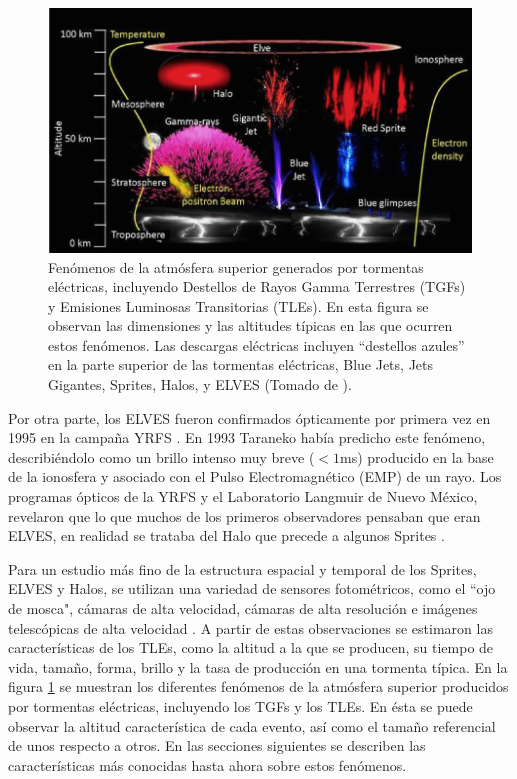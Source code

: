 \documentclass[12pt,oneside,openany,letter]{book}
\begin{document}
\begin{figure}
    \centering
    \includegraphics[scale=0.75]{figures/tle_and_tgf.png}
    \caption[Fenómenos de la atmósfera superior generados por tormentas eléctricas]{Fenómenos de la atmósfera superior generados por tormentas eléctricas, incluyendo Destellos de Rayos Gamma Terrestres (TGFs) y Emisiones Luminosas Transitorias (TLEs). En esta figura se observan las dimensiones y las altitudes típicas en las que ocurren estos fenómenos. Las descargas eléctricas incluyen ``destellos azules'' en la parte superior de las tormentas eléctricas, Blue Jets, Jets Gigantes, Sprites, Halos, y ELVES (Tomado de \cite{Gaskill2018}).}
    \label{fig:tle_and_tgf}
\end{figure}

Por otra parte, los ELVES fueron confirmados ópticamente por primera vez en 1995 en la campaña YRFS \cite{FukunishiEtal1996}. En 1993 Taraneko \cite{TaranenkoEtal1993} había predicho este fenómeno, describiéndolo como un brillo intenso muy breve ($<1$ms) producido en la base de la ionosfera y asociado con el Pulso Electromagnético (EMP) de un rayo. Los programas ópticos de la YRFS y el Laboratorio Langmuir de Nuevo México, revelaron que lo que muchos de los primeros observadores pensaban que eran ELVES, en realidad se trataba del Halo que precede a algunos Sprites \cite{FullekrugEtal2006}. 

Para un estudio más fino de la estructura espacial y temporal de los Sprites, ELVES y Halos, se utilizan una variedad de sensores fotométricos, como el ``ojo de mosca", cámaras de alta velocidad, cámaras de alta resolución e imágenes telescópicas de alta velocidad \cite{FullekrugEtal2006}. A partir de estas observaciones se estimaron las características de los TLEs, como la altitud a la que se producen, su tiempo de vida, tamaño, forma, brillo y la tasa de producción en una tormenta típica. En la figura \ref{fig:tle_and_tgf} se muestran los diferentes fenómenos de la atmósfera superior producidos por tormentas eléctricas, incluyendo los TGFs y los TLEs. En ésta se puede observar la altitud característica de cada evento, así como el tamaño referencial de unos respecto a otros. En las secciones siguientes se describen las características más conocidas hasta ahora sobre estos fenómenos. 
\end{document}
